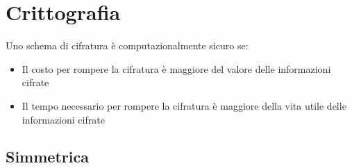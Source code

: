 \documentclass{article}
\begin{document}
\section{Crittografia}

Uno schema di cifratura è computazionalmente sicuro se:
\begin{itemize}
    \item Il costo per rompere la cifratura è maggiore del valore delle informazioni cifrate
    \item Il tempo necessario per rompere la cifratura è maggiore della vita utile delle informazioni cifrate\newline
\end{itemize}

\subsection{Simmetrica}
\end{document}
